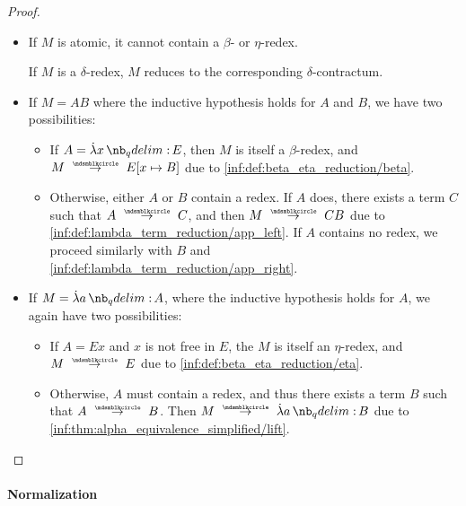 \begin{proof}
  \begin{itemize}
    \item If \( M \) is atomic, it cannot contain a \( \beta \)- or \( \eta \)-redex.

    If \( M \) is a \( \delta \)-redex, \( M \) reduces to the corresponding \( \delta \)-contractum.

    \item If \( M = AB \) where the inductive hypothesis holds for \( A \) and \( B \), we have two possibilities:
    \begin{itemize}
      \item If \( A = \qabs x E \), then \( M \) is itself a \( \beta \)-redex, and \( M \pred E[x \mapsto B] \) due to \ref{inf:def:beta_eta_reduction/beta}.
      \item Otherwise, either \( A \) or \( B \) contain a redex. If \( A \) does, there exists a term \( C \) such that \( A \pred C \), and then \( M \pred CB \) due to \ref{inf:def:lambda_term_reduction/app_left}. If \( A \) contains no redex, we proceed similarly with \( B \) and \ref{inf:def:lambda_term_reduction/app_right}.
    \end{itemize}

    \item If \( M = \qabs a A \), where the inductive hypothesis holds for \( A \), we again have two possibilities:
    \begin{itemize}
      \item If \( A = Ex \) and \( x \) is not free in \( E \), the \( M \) is itself an \( \eta \)-redex, and \( M \pred E \) due to \ref{inf:def:beta_eta_reduction/eta}.

      \item Otherwise, \( A \) must contain a redex, and thus there exists a term \( B \) such that \( A \pred B \). Then \( M \pred \qabs a B \) due to \ref{inf:thm:alpha_equivalence_simplified/lift}.
    \end{itemize}
  \end{itemize}
\end{proof}

\paragraph{Normalization}


